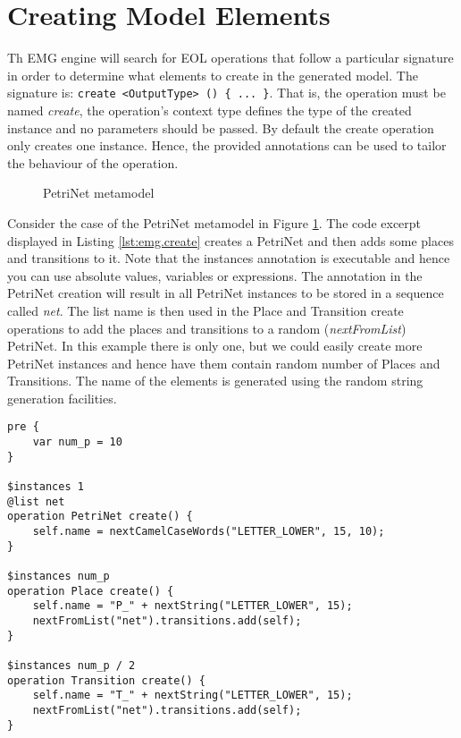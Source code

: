 \section{Creating Model Elements}\label{sec:emg.createElements}

Th EMG engine will search for EOL operations that follow a particular signature in order to determine what elements to create in the generated model. The signature is: \texttt{create <OutputType> () \{ ... \}}. That is, the operation must be named \emph{create}, the operation's context type defines the type of the created instance and no parameters should be passed. By default the create operation only creates one instance. Hence, the provided annotations can be used to tailor the behaviour of the operation.

\begin{figure}[htbp]
    \begin{center}
        \caption{PetriNet metamodel}
        \label{fig:PetriNetMM}
    \end{center}
\end{figure}

Consider the case of the PetriNet metamodel in Figure \ref{fig:PetriNetMM}. The code excerpt displayed in Listing \ref{lst:emg.create} creates a PetriNet and then adds some places and transitions to it. Note that the instances annotation is executable and hence you can use absolute values, variables or expressions. The \texttt{\@list} annotation in the PetriNet creation will result in all PetriNet instances to be stored in a sequence called \emph{net}. The list name is then used in the Place and Transition create operations to add the places and transitions to a random (\emph{nextFromList}) PetriNet. In this example there is only one, but we could easily create more PetriNet instances and hence have them contain random number of Places and Transitions. The name of the elements is generated using the random string generation facilities. 

\begin{lstlisting}[float=h, caption={EMG create operations}, label=lst:emg.create, language=EOL]
pre {
    var num_p = 10
}

$instances 1
@list net
operation PetriNet create() {
    self.name = nextCamelCaseWords("LETTER_LOWER", 15, 10);
}

$instances num_p
operation Place create() {
    self.name = "P_" + nextString("LETTER_LOWER", 15);
    nextFromList("net").transitions.add(self);
}

$instances num_p / 2
operation Transition create() {
    self.name = "T_" + nextString("LETTER_LOWER", 15);
    nextFromList("net").transitions.add(self);
}
\end{lstlisting}

